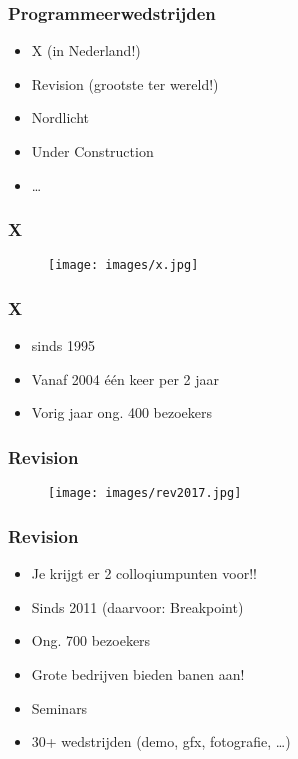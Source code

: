 \documentclass[aspectratio=43]{uva-inf-presentation}
\begin{document}
\begin{frame}
\frametitle{Programmeerwedstrijden}

\begin{itemize}
\item X (in Nederland!)
\item Revision (grootste ter wereld!)
\item Nordlicht
\item Under Construction
\item \dots
\end{itemize}

\end{frame}


\begin{frame}
\frametitle{X}

\begin{figure}
\texttt{[image: images/x.jpg]}
\end{figure}

\end{frame}


\begin{frame}[noframenumbering]
\frametitle{X}

\begin{itemize}
\item sinds 1995
\item Vanaf 2004 \'e\'en keer per 2 jaar
\item Vorig jaar ong. 400 bezoekers
\end{itemize}

\end{frame}


\begin{frame}
\frametitle{Revision}

\begin{figure}
\texttt{[image: images/rev2017.jpg]}
\end{figure}

\end{frame}


\begin{frame}[noframenumbering]
\frametitle{Revision}

\begin{itemize}
\item Je krijgt er 2 colloqiumpunten voor!!
\item Sinds 2011 (daarvoor: Breakpoint)
\item Ong. 700 bezoekers
\item Grote bedrijven bieden banen aan!
\item Seminars
\item 30+ wedstrijden (demo, gfx, fotografie, \dots)
\end{itemize}
\end{frame}
\end{document}
